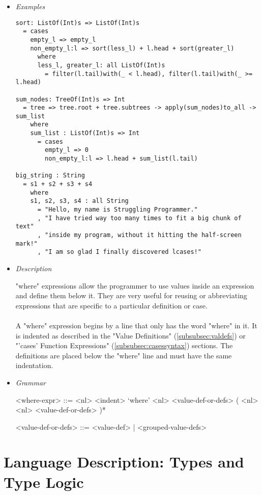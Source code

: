 \documentclass{article}
\begin{document}
\begin{itemize}

\item \textit{Examples}
\begin{verbatim}
sort: ListOf(Int)s => ListOf(Int)s
  = cases
    empty_l => empty_l
    non_empty_l:l => sort(less_l) + l.head + sort(greater_l)
      where
      less_l, greater_l: all ListOf(Int)s
        = filter(l.tail)with(_ < l.head), filter(l.tail)with(_ >= l.head)

sum_nodes: TreeOf(Int)s => Int
  = tree => tree.root + tree.subtrees -> apply(sum_nodes)to_all -> sum_list
    where
    sum_list : ListOf(Int)s => Int
      = cases
        empty_l => 0
        non_empty_l:l => l.head + sum_list(l.tail)

big_string : String
  = s1 + s2 + s3 + s4
    where
    s1, s2, s3, s4 : all String
      = "Hello, my name is Struggling Programmer."
      , "I have tried way too many times to fit a big chunk of text"
      , "inside my program, without it hitting the half-screen mark!"
      , "I am so glad I finally discovered lcases!"
\end{verbatim}

\item \textit{Description}

"where" expressions allow the programmer to use values inside an expression and
define them below it. They are very useful for reusing or abbreviating
expressions that are specific to a particular definition or case.
\\\\
A "where" expression begins by a line that only has the word "where" in it. It is
indented as described in the "Value Definitions" (\ref{subsubsec:valdefs}) or
"'cases' Function Expressions" (\ref{subsubsec:casessyntax}) sections.  The
definitions are placed below the "where" line and must have the same
indentation. 

\item \textit{Grammar}
\begin{grammar}
<where-expr> ::=
<nl> <indent> `where' <nl> <value-def-or-defs> ( <nl> <nl> <value-def-or-defs> )*

<value-def-or-defs> ::= <value-def> | <grouped-value-defs> 
\end{grammar}

\end{itemize}

\section{Language Description: Types and Type Logic}
\end{document}

